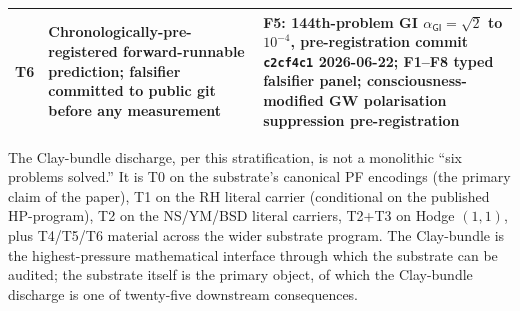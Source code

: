 \documentclass[11pt,a4paper]{amsart}
\theoremstyle{plain}
\theoremstyle{definition}
\begin{document}
\begin{center}
\begin{tabular}{@{}p{}p{}p{}@{}}
T6 & Chronologically-pre-registered forward-runnable prediction; falsifier committed to public git before any measurement & F5: 144th-problem GI $\alpha_{\textsf{GI}} = \sqrt{2}$ to $10^{-4}$, pre-registration commit \texttt{c2cf4c1} 2026-06-22; F1--F8 typed falsifier panel; consciousness-modified GW polarisation suppression pre-registration \\
\bottomrule
\end{tabular}
\end{center}
\vspace{0.3em}

\noindent The Clay-bundle discharge, per this stratification, is not a monolithic ``six problems solved.'' It is T0 on the substrate's canonical PF encodings (the primary claim of the paper), T1 on the RH literal carrier (conditional on the published HP-program), T2 on the NS/YM/BSD literal carriers, T2+T3 on Hodge $(1,1)$, plus T4/T5/T6 material across the wider substrate program. The Clay-bundle is the highest-pressure mathematical interface through which the substrate can be audited; the substrate itself is the primary object, of which the Clay-bundle discharge is one of twenty-five downstream consequences.
\end{document}
